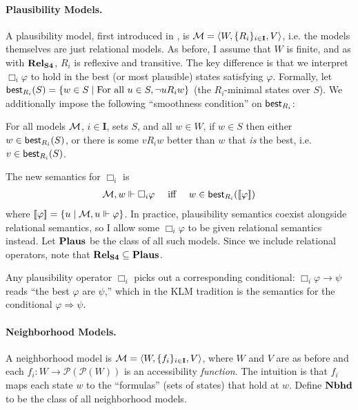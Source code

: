 \documentclass[letterpaper]{article}
\begin{document}
\paragraph*{Plausibility Models.}
A plausibility model, first introduced in \cite{kraus1990nonmonotonic}, is $\mathcal{M} = \langle W, \{ R_i \}_{i \in \textbf{I}}, V \rangle$, i.e. the models themselves are just relational models.  As before, I assume that $W$ is finite, and as with $\textrm{\textbf{Rel}}_\textrm{\textbf{S4}}$, $R_i$ is reflexive and transitive.  The key difference is that we interpret $\Box_i \varphi$ to hold in the best (or most plausible) states satisfying $\varphi$.  Formally, let $\mathsf{best}_{R_i}{(S)} = \{ w \in S \mid \textrm{For all } u \in S, \neg u {R_i} w \}$ (the $R_i$-minimal states over $S$).  We additionally impose the following ``smoothness condition'' \cite{kraus1990nonmonotonic} on $\mathsf{best}_{R_i}$:
\begin{postulate*}
    For all models $\mathcal{M}$, $i \in \textbf{I}$, sets $S$, and all $w \in W$, if $w \in S$ then either $w \in \mathsf{best}_{R_i}(S)$, or there is some $v{R_i}w$ better than $w$ that \emph{is} the best, i.e. $v \in \mathsf{best}_{R_i}(S)$.
\end{postulate*}
The new semantics for $\Box_i$ is
\[
\begin{array}{lcl}
    \mathcal{M}, w \Vdash \Box_i \varphi & \mbox{ iff } & w \in \mathsf{best}_{R_i}{([\![\mbox{\em $ \varphi $\/}]\!])}
\end{array}
\]
where $[\![\mbox{\em $ \varphi $\/}]\!] = \{ u \mid \mathcal{M}, u \Vdash \varphi \}$.  In practice, plausibility semantics coexist alongside relational semantics, so I allow some $\Box_i \varphi$ to be given relational semantics instead.  Let $\textrm{\textbf{Plaus}}$ be the class of all such models.  Since we include relational operators, note that $\textrm{\textbf{Rel}}_\textrm{\textbf{S4}} \subseteq \textrm{\textbf{Plaus}}$.

Any plausibility operator $\Box_i$ picks out a corresponding conditional: $\Box_i \varphi \to \psi$ reads ``the best $\varphi$ are $\psi$,'' which in the KLM tradition is the semantics for the conditional $\varphi \Rightarrow \psi$.

\paragraph*{Neighborhood Models.} A neighborhood model is $\mathcal{M} = \langle W, \{ f_i \}_{i \in \textbf{I}}, V \rangle$, where $W$ and $V$ are as before and each $f_i : W \to \mathcal{P}(\mathcal{P}(W))$ is an accessibility \emph{function}.  The intuition is that $f_i$ maps each state $w$ to the ``formulas'' (sets of states) that hold at $w$.  Define $\textrm{\textbf{Nbhd}}$ to be the class of all neighborhood models.  
\end{document}
